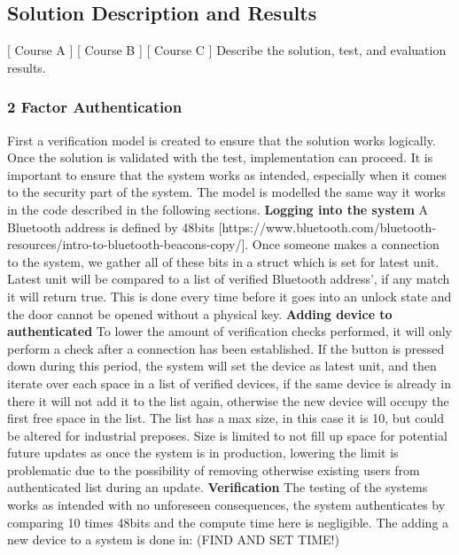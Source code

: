 \subsection{Solution Description and Results}
[ Course A ] [ Course B ] [ Course C ] 
\newline
Describe the solution, test, and evaluation results.
\subsubsection{2 Factor Authentication}
First a verification model is created to ensure that the solution works logically. Once the solution is validated with the test, implementation can proceed. It is important to ensure that the system works as intended, especially when it comes to the security part of the system. The model is modelled the same way it works in the code described in the following sections.
\newline
\textbf{Logging into the system}\newline
A Bluetooth address is defined by 48bits [https://www.bluetooth.com/bluetooth-resources/intro-to-bluetooth-beacons-copy/]. Once someone makes a connection to the system, we gather all of these bits in a struct which is set for latest unit. Latest unit will be compared to a list of verified Bluetooth address', if any match it will return true. This is done every time before it goes into an unlock state and the door cannot be opened without a physical key.
\newline
\textbf{Adding device to authenticated}\newline
To lower the amount of verification checks performed, it will only perform a check after a connection has been established. If the button is pressed down during this period, the system will set the device as latest unit, and then iterate over each space in a list of verified devices, if the same device is already in there it will not add it to the list again, otherwise the new device will occupy the first free space in the list. The list has a max size, in this case it is 10, but could be altered for industrial preposes. Size is limited to not fill up space for potential future updates as once the system is in production, lowering the limit is problematic due to the possibility of removing otherwise existing users from authenticated list during an update.
\newline
\textbf{Verification}\newline
The testing of the systems works as intended with no unforeseen consequences, the system authenticates by comparing 10 times 48bits and the compute time here is negligible. The adding a new device to a system is done in: (FIND AND SET TIME!)

